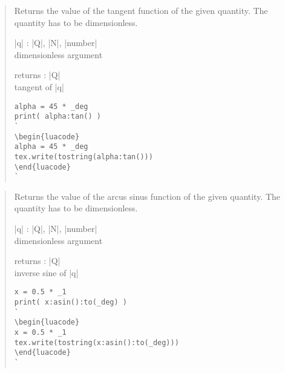 \documentclass{ltxdoc}
\begin{document}
\begin{quote}
  Returns the value of the tangent function of the given quantity. The quantity has to be dimensionless.

  \begin{description}
  \item |q| : |Q|, |N|, |number|\\
    dimensionless argument

  \item returns : |Q|\\
    tangent of |q|
  \end{description}

\begin{lstlisting}
alpha = 45 * _deg
print( alpha:tan() )
`
\begin{luacode}
alpha = 45 * _deg
tex.write(tostring(alpha:tan()))
\end{luacode}
`
\end{lstlisting}

\end{quote}



\begin{quote}
  Returns the value of the arcus sinus function of the given quantity. The quantity has to be dimensionless.

  \begin{description}
  \item |q| : |Q|, |N|, |number|\\
    dimensionless argument

  \item returns : |Q|\\
    inverse sine of |q|
  \end{description}

\begin{lstlisting}
x = 0.5 * _1
print( x:asin():to(_deg) )
`
\begin{luacode}
x = 0.5 * _1
tex.write(tostring(x:asin():to(_deg)))
\end{luacode}
`
\end{lstlisting}

\end{quote}
\end{document}
